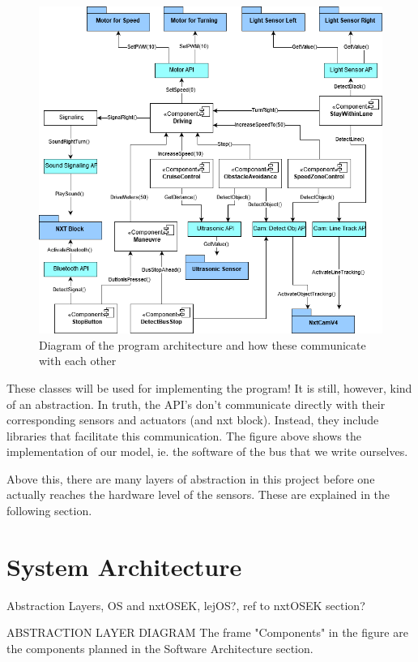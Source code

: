 \begin{figure}[ht]
    \includegraphics[width=\textwidth]{Images/Design/architectureClassDiagram.png}
    \caption{Diagram of the program architecture and how these communicate with each other}
    \label{give label}
\end{figure}

These classes will be used for implementing the program! It is still, however, kind of an abstraction.
In truth, the API's don't communicate directly with their corresponding sensors and actuators (and nxt block). 
Instead, they include libraries that facilitate this communication. 
The figure above shows the implementation of our model, ie. the software of the bus that we write ourselves.

Above this, there are many layers of abstraction in this project before one actually reaches the hardware level of the sensors. These are explained in the following section. 

\section{System Architecture}

Abstraction Layers, OS and nxtOSEK, lejOS?, ref to nxtOSEK section?

ABSTRACTION LAYER DIAGRAM
The frame "Components" in the figure are the components planned in the Software Architecture section. 

